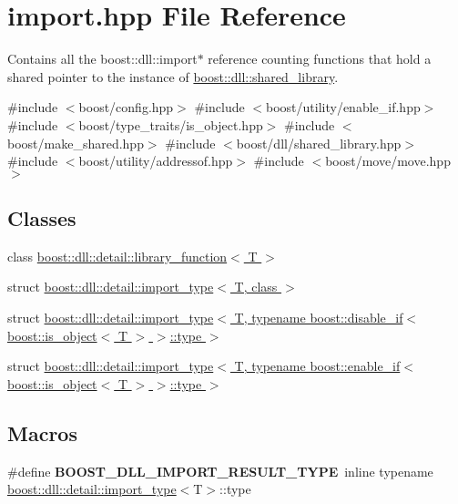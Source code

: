 \hypertarget{a00254}{}\section{import.\+hpp File Reference}
\label{a00254}


Contains all the boost\+::dll\+::import$\ast$ reference counting functions that hold a shared pointer to the instance of \hyperlink{a01708}{boost\+::dll\+::shared\+\_\+library}.  


{\ttfamily \#include $<$boost/config.\+hpp$>$}\newline
{\ttfamily \#include $<$boost/utility/enable\+\_\+if.\+hpp$>$}\newline
{\ttfamily \#include $<$boost/type\+\_\+traits/is\+\_\+object.\+hpp$>$}\newline
{\ttfamily \#include $<$boost/make\+\_\+shared.\+hpp$>$}\newline
{\ttfamily \#include $<$boost/dll/shared\+\_\+library.\+hpp$>$}\newline
{\ttfamily \#include $<$boost/utility/addressof.\+hpp$>$}\newline
{\ttfamily \#include $<$boost/move/move.\+hpp$>$}\newline
\subsection*{Classes}
\begin{DoxyCompactItemize}
\item 
class \hyperlink{a01632}{boost\+::dll\+::detail\+::library\+\_\+function$<$ T $>$}
\item 
struct \hyperlink{a01636}{boost\+::dll\+::detail\+::import\+\_\+type$<$ T, class $>$}
\item 
struct \hyperlink{a01640}{boost\+::dll\+::detail\+::import\+\_\+type$<$ T, typename boost\+::disable\+\_\+if$<$ boost\+::is\+\_\+object$<$ T $>$ $>$\+::type $>$}
\item 
struct \hyperlink{a01644}{boost\+::dll\+::detail\+::import\+\_\+type$<$ T, typename boost\+::enable\+\_\+if$<$ boost\+::is\+\_\+object$<$ T $>$ $>$\+::type $>$}
\end{DoxyCompactItemize}
\subsection*{Macros}
\begin{DoxyCompactItemize}
\item 
\mbox{\label{a00254_a970b9f65fd3a27056507924072cfa150}} 
\#define {\bfseries B\+O\+O\+S\+T\+\_\+\+D\+L\+L\+\_\+\+I\+M\+P\+O\+R\+T\+\_\+\+R\+E\+S\+U\+L\+T\+\_\+\+T\+Y\+PE}~inline typename \hyperlink{a01636}{boost\+::dll\+::detail\+::import\+\_\+type}$<$T$>$\+::type
\end{DoxyCompactItemize}
